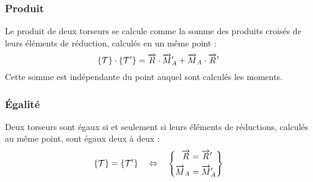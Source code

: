		\subsubsection{Produit}
			\label{sec:produit-torseurs}
		Le produit de deux torseurs se calcule comme la somme des produits croisés de leurs éléments de réduction, calculés en un même point :
		\begin{equation}
			\left\lbrace\mathcal{T}\right\rbrace\cdot\left\lbrace\mathcal{T}'\right\rbrace=
				\overrightarrow{R}\cdot\overrightarrow{M}_A'+\overrightarrow{M}_A\cdot\overrightarrow{R}'
		\end{equation}
		Cette somme est indépendante du point auquel sont calculés les moments.	
		
		\subsubsection{Égalité}
		Deux torseurs sont égaux si et seulement si leurs éléments de réductions, calculés au même point, sont égaux deux à deux :
		\begin{equation}
			\left\lbrace\mathcal{T}\right\rbrace=\left\lbrace\mathcal{T}'\right\rbrace
			\quad\Leftrightarrow\quad
			\left\lbrace
				\begin{aligned}
					\overrightarrow{R}&=\overrightarrow{R}'\\
					\overrightarrow{M}_A&=\overrightarrow{M}_A'
				\end{aligned}
			\right\rbrace
		\end{equation}	
		

